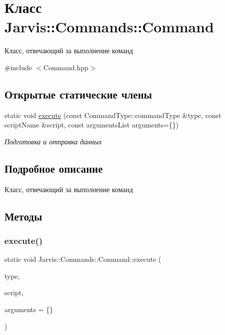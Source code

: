 \hypertarget{classJarvis_1_1Commands_1_1Command}{}\section{Класс Jarvis\+:\+:Commands\+:\+:Command}
\label{classJarvis_1_1Commands_1_1Command}


Класс, отвечающий за выполнение команд  




{\ttfamily \#include $<$Command.\+hpp$>$}

\subsection*{Открытые статические члены}
\begin{DoxyCompactItemize}
\item 
static void \hyperlink{classJarvis_1_1Commands_1_1Command_a5473be719a2a0bb9cb6144bf8303f27b}{execute} (const Command\+Type\+::command\+Type \&type, const script\+Name \&script, const arguments\+List arguments=\{\})
\begin{DoxyCompactList}\small\item\em Подготовка и отправка данных \end{DoxyCompactList}\end{DoxyCompactItemize}


\subsection{Подробное описание}
Класс, отвечающий за выполнение команд 

\subsection{Методы}
\mbox{\label{classJarvis_1_1Commands_1_1Command_a5473be719a2a0bb9cb6144bf8303f27b}} 
\subsubsection{\texorpdfstring{execute()}{execute()}}
{\footnotesize\ttfamily static void Jarvis\+::\+Commands\+::\+Command\+::execute (\begin{DoxyParamCaption}\item[{const Command\+Type\+::command\+Type \&}]{type,  }\item[{const script\+Name \&}]{script,  }\item[{const arguments\+List}]{arguments = {\ttfamily \{\}} }\end{DoxyParamCaption})\hspace{0.3cm}{\ttfamily [static]}}



